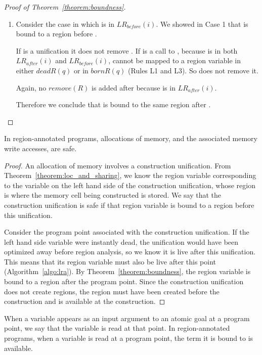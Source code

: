 \documentclass{tlp}
\newcommand{\LRb}[1]{\ensuremath{\mathit{LR}_{before}(#1)}}
\newcommand{\LRa}[1]{\ensuremath{\mathit{LR}_{after}(#1)}}
\newcommand{\bornR}[1]{\ensuremath{{bornR}(#1)}}
\newcommand{\deadR}[1]{\ensuremath{{deadR}(#1)}}
\newcommand{\remove}[1]{\ensuremath{{remove}(#1)}}
\begin{document}
\begin{proof}[Proof of Theorem~\ref{theorem:boundness}]
\begin{description}
\begin{enumerate}
    \item
        Consider the case in which  is in \LRb{i}.
        We showed in Case 1 that  is bound to a region before .

        If  is a unification it does not remove .
        If  is a call to ,
        because  is in both \LRa{i} and \LRb{i},
         cannot be mapped to a region variable
        in either \deadR{q} or in \bornR{q} (Rules L1 and L3).
        So  does not remove it.

        Again, no \remove{R} is added after  because  is in \LRa{i}.

        Therefore we conclude that
         is bound to the same region after .
    \end{enumerate}
\end{description}
\end{proof}

\begin{theorem}
In region-annotated programs,
allocations of memory, and the associated memory write accesses, are safe.
\end{theorem}

\begin{proof}
An allocation of memory involves a construction unification.
From Theorem~\ref{theorem:loc_and_sharing},
we know the region variable corresponding to
the variable on the left hand side of the construction unification,
whose region is where the memory cell being constructed is stored.
We say that the construction unification is safe
if that region variable is bound to a region before this unification.

Consider the program point associated with the construction unification.
If the left hand side variable were instantly dead,
the unification would have been optimized away before region analysis,
so we know it is live after this unification.
This means that its region variable
must also be live after this point (Algorithm~\ref{algo:lra}).
By Theorem~\ref{theorem:boundness},
the region variable is bound to a region after the program point.
Since the construction unification does not create regions,
the region must have been created before the construction
and is available at the construction.
\end{proof}

\begin{theorem}
When a variable appears as an input argument
to an atomic goal at a program point,
we say that the variable is read at that point.
In region-annotated programs,
when a variable is read at a program point,
the term it is bound to is available.
\end{theorem}
\end{document}
